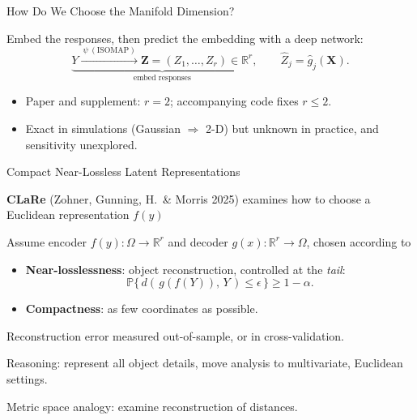 \documentclass[compress]{beamer}
\newcommand{\tR}{\mathbb{R}}
\newcommand{\Zbold}{\bm{Z}}
\newcommand{\Xbold}{\bm{X}}
\begin{document}
\begin{frame}{How Do We Choose the Manifold Dimension?}

Embed the responses, then predict the embedding with a deep network:
\[
\underbrace{Y \xrightarrow{\ \psi \ (\text{ISOMAP})\ } \Zbold = (Z_1,\dots,Z_r) \in \tR^r}_{\text{embed responses}},
\qquad
\hat{Z}_j = \hat{g}_j(\Xbold).
\]

\begin{itemize}
\item Paper and supplement: $r = 2$; accompanying code fixes $r \le 2$.

\item Exact in simulations (Gaussian $\Rightarrow$ 2-D) but unknown in practice, and sensitivity  unexplored.
\end{itemize}

\end{frame}


\begin{frame}{Compact Near-Lossless Latent Representations} 

{\bf CLaRe} (Zohner, Gunning, H.\ \& Morris 2025) examines how to choose a Euclidean representation $f(y)$

\vspace{0.2cm}

Assume encoder $f(y): \Omega \rightarrow \mathbb{R}^r$ and decoder $g(x): \mathbb{R}^r \rightarrow \Omega$, chosen according to

\begin{itemize}
\item {\bf Near-losslessness}: object reconstruction, controlled at the {\em tail}:
\[
\mathbb{P}\{\, d(\,g(f(Y)),\,Y\,) \le \epsilon \,\} \ge 1-\alpha.
\]

\item {\bf Compactness}: as few coordinates as possible.
\end{itemize}

Reconstruction error measured out-of-sample, or in cross-validation. 

\vspace{0.2cm}

Reasoning: represent all object details, move analysis to multivariate, Euclidean settings. 

\vspace{0.2cm}

Metric space analogy: examine reconstruction of distances. 

\end{frame}
\end{document}
